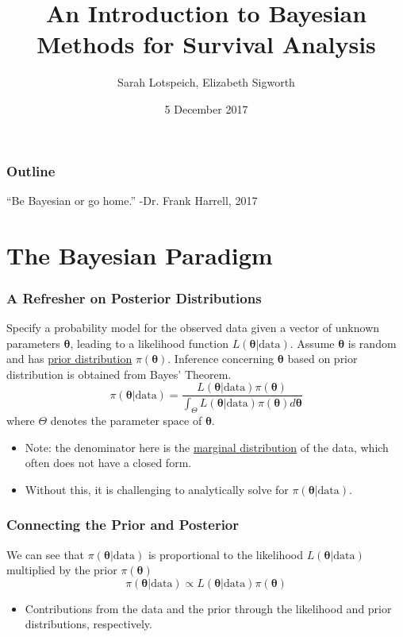 \documentclass{beamer}
\title{An Introduction to Bayesian Methods for Survival Analysis}
\author{Sarah Lotspeich, Elizabeth Sigworth}
\institute{Vanderbilt University}
\date{5 December 2017}
\begin{document}
\begin{frame}
\titlepage
\end{frame}

\begin{frame}
\frametitle{Outline}
\tableofcontents
\end{frame}

\begin{frame}[c]
\begin{center}
\Huge
``Be Bayesian or go home.''  
\huge
-Dr. Frank Harrell, 2017
\end{center}
\end{frame}

\section{The Bayesian Paradigm}
\begin{frame}
\frametitle{A Refresher on Posterior Distributions}
Specify a probability model for the observed data given a vector of unknown parameters $\pmb{\theta}$, leading to a likelihood function $L(\pmb{\theta}|\text{data})$. Assume $\pmb{\theta}$ is random and has \underline{prior distribution} $\pi(\pmb{\theta})$. Inference concerning $\pmb{\theta}$ based on prior distribution is obtained from Bayes' Theorem. 
$$\pi(\pmb{\theta}|\text{data}) = \frac{L(\pmb{\theta}|\text{data})\pi(\pmb{\theta})}{\int_{\Theta}L(\pmb{\theta}|\text{data})\pi(\pmb{\theta}) d\pmb{\theta}}$$
where $\Theta$ denotes the parameter space of $\pmb{\theta}$. \footnotemark
\begin{itemize}
\item Note: the denominator here is the \underline{marginal distribution} of the data, which often does not have a closed form. 
\item Without this, it is challenging to analytically solve for $\pi(\pmb{\theta}|\text{data})$. 
\end{itemize}
\end{frame}

\begin{frame}
\frametitle{Connecting the Prior and Posterior}
We can see that $\pi(\pmb{\theta}|\text{data})$ is proportional to the likelihood $L(\pmb{\theta}|\text{data})$ multiplied by the prior $\pi(\pmb{\theta})$
$$\pi(\pmb{\theta}|\text{data}) \propto L(\pmb{\theta}|\text{data})\pi(\pmb{\theta})$$
\begin{itemize}
\item Contributions from the data and the prior through the likelihood and prior distributions, respectively. 
\end{itemize}
\end{frame}
\end{document}
